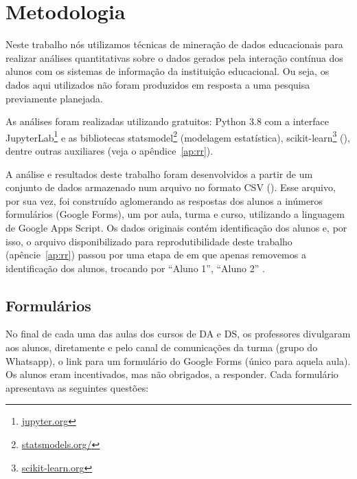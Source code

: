 \section{Metodologia}

Neste trabalho nós utilizamos técnicas de mineração de dados educacionais \cite{Baker2011} para realizar análises quantitativas sobre o dados gerados pela interação contínua dos alunos com os sistemas de informação da instituição educacional.
Ou seja, os dados aqui utilizados não foram produzidos em resposta a uma pesquisa previamente planejada.

As análises foram realizadas utilizando  gratuitos: Python 3.8 com a interface JupyterLab\footnote{\url{jupyter.org}} e as bibliotecas statsmodel\footnote{\url{statsmodels.org/}} (modelagem estatística), scikit-learn\footnote{\url{scikit-learn.org}} (), dentre outras auxiliares (veja o apêndice~\ref{ap:rr}).

A análise e resultados deste trabalho foram desenvolvidos a partir de um conjunto de dados armazenado num arquivo no formato CSV ().
Esse arquivo, por sua vez, foi construído aglomerando as respostas dos alunos a inúmeros formulários (Google Forms), um por aula, turma e curso, utilizando a linguagem de  Google Apps Script.
Os dados originais contém identificação dos alunos e, por isso, o arquivo disponibilizado para reprodutibilidade deste trabalho (apêncie~\ref{ap:rr}) passou por uma etapa de em que apenas removemos a identificação dos alunos, trocando por ``Aluno 1'', ``Aluno 2'' \etc.

\subsection{Formulários}

No final de cada uma das aulas dos cursos de DA e DS, os professores divulgaram aos alunos, diretamente e pelo canal de comunicações da turma (grupo do Whatsapp), o link para um formulário do Google Forms (único para aquela aula).
Os alunos eram incentivados, mas não obrigados, a responder.
Cada formulário apresentava as seguintes questões:

